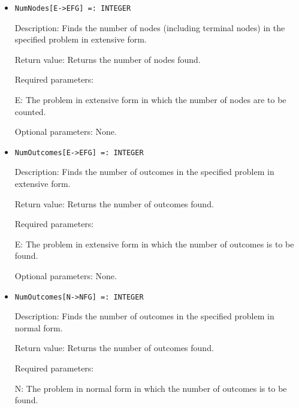 \begin{itemize}
\item
\protect \large \begin{verbatim}
NumNodes[E->EFG] =: INTEGER
\end{verbatim}\normalsize

\bd
\item
[Description:] Finds the number of nodes (including terminal nodes) in
the specified problem in extensive form.
\item
[Return value:] Returns the number of nodes found.
\item
[Required parameters:]\hfil\null

\bd
\item
[E:] The problem in extensive form in which the number of nodes are to
be counted.
\ed

\item
[Optional parameters:] None.
\ed

\item
\protect \large \begin{verbatim}
NumOutcomes[E->EFG] =: INTEGER
\end{verbatim} \normalsize

\bd
\item
[Description:] Finds the number of outcomes in the specified problem
in extensive form.
\item
[Return value:] Returns the number of outcomes found.
\item
[Required parameters:] \hfil\null

\bd
\item
[E:] The problem in extensive form in which the number of outcomes is
to be found.
\ed

\item
[Optional parameters:] None.
\ed

\item
\protect \large \begin{verbatim}
NumOutcomes[N->NFG] =: INTEGER
\end{verbatim}\normalsize

\bd
\item
[Description:] Finds the number of outcomes in the specified problem
in normal form.
\item
[Return value:] Returns the number of outcomes found.
\item
[Required parameters:]\hfil\null
	
\bd
\item
[N:] The problem in normal form in which the number of outcomes is to
be found.
\ed


\end{itemize}
